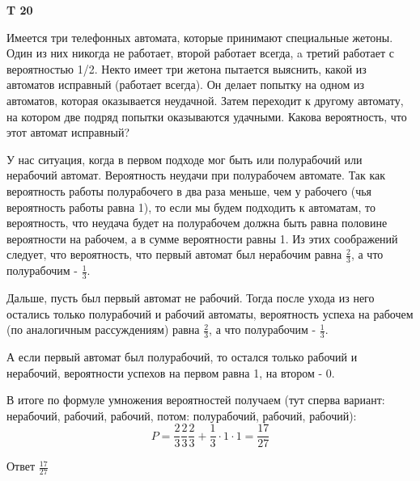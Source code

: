 \documentclass[a4paper,12pt]{article} %
\begin{document}
\begin{example}\textbf{T 20}

Имеется три телефонных автомата, которые принимают специальные жетоны. 
Один из них никогда не работает, второй работает всегда, a третий работает с вероятностью 1/2. 
Некто имеет три жетона  пытается выяснить, какой из автоматов исправный (работает всегда). 
Он делает попытку на одном из автоматов, которая оказывается неудачной.
Затем переходит к другому автомату, на котором две подряд попытки оказываются удачными. 
Какова вероятность, что этот автомат исправный?


У нас ситуация, когда в первом подходе мог быть или полурабочий или нерабочий автомат.
Вероятность неудачи при полурабочем автомате. 
Так как вероятность работы полурабочего в два раза меньше, чем у рабочего (чья вероятность работы равна 1), 
то если мы будем подходить к автоматам, то вероятность, что неудача будет на полурабочем должна быть равна половине вероятности на рабочем, а в сумме вероятности равны 1. 
Из этих соображений следует, что вероятность, что первый автомат был нерабочим равна $ \frac{2}{3}$, а что полурабочим - $ \frac{1}{3}$.

Дальше, пусть был первый автомат не рабочий. Тогда после ухода из него остались только полурабочий и рабочий автоматы, 
вероятность успеха на рабочем (по аналогичным рассуждениям) равна $ \frac{2}{3}$, а что полурабочим - $ \frac{1}{3}$.

А если первый автомат был полурабочий, то остался только рабочий и нерабочий, вероятности успехов на первом равна 1, на втором - 0.

В итоге по формуле умножения вероятностей получаем (тут сперва вариант: нерабочий, рабочий, рабочий, потом: полурабочий, рабочий, рабочий):
\[ P=\frac{2}{3} \frac{2}{3} \frac{2}{3}+\frac{1}{3}\cdot 1\cdot 1=\frac{17}{27}
\]

Ответ $ \frac{17}{27} $

\end{example}
\end{document}

